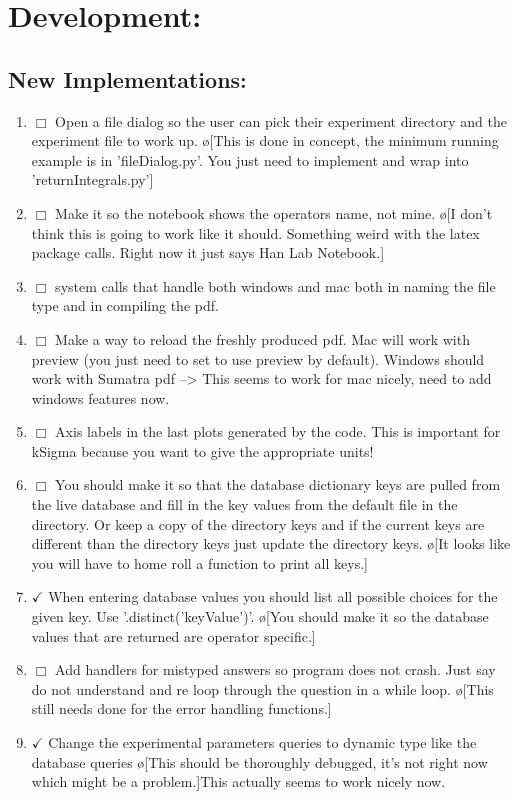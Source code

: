 \documentclass[10pt]{book}
\begin{document}
\section{Development:}
\subsection{New Implementations:}
\begin{enumerate}
    \item $\Box$ Open a file dialog so the user can pick their experiment directory and the experiment file to work up. \o[This is done in concept, the minimum running example is in 'fileDialog.py'. You just need to implement and wrap into 'returnIntegrals.py']
    \item $\Box$ Make it so the notebook shows the operators name, not mine. \o[I don't think this is going to work like it should. Something weird with the latex package calls. Right now it just says Han Lab Notebook.]
    \item $\Box$ system calls that handle both windows and mac both in naming the file type and in compiling the pdf.
    \item $\Box$ Make a way to reload the freshly produced pdf. Mac will work with preview (you just need to set to use preview by default). Windows should work with Sumatra pdf --> This seems to work for mac nicely, need to add windows features now.
    \item $\Box$ Axis labels in the last plots generated by the code. This is important for kSigma because you want to give the appropriate units!
    \item $\Box$ You should make it so that the database dictionary keys are pulled from the live database and fill in the key values from the default file in the directory. Or keep a copy of the directory keys and if the current keys are different than the directory keys just update the directory keys. \o[It looks like you will have to home roll a function to print all keys.]{}
    \item $\checkmark$ When entering database values you should list all possible choices for the given key. Use '.distinct('keyValue')'. \o[You should make it so the database values that are returned are operator specific.]{}
    \item $\Box$ Add handlers for mistyped answers so program does not crash. Just say do not understand and re loop through the question in a while loop. \o[This still needs done for the error handling functions.]{}
    \item $\checkmark$ Change the experimental parameters queries to dynamic type like the database queries \o[This should be thoroughly debugged, it's not right now which might be a problem.]{This actually seems to work nicely now.}

\end{enumerate}
\end{document}
